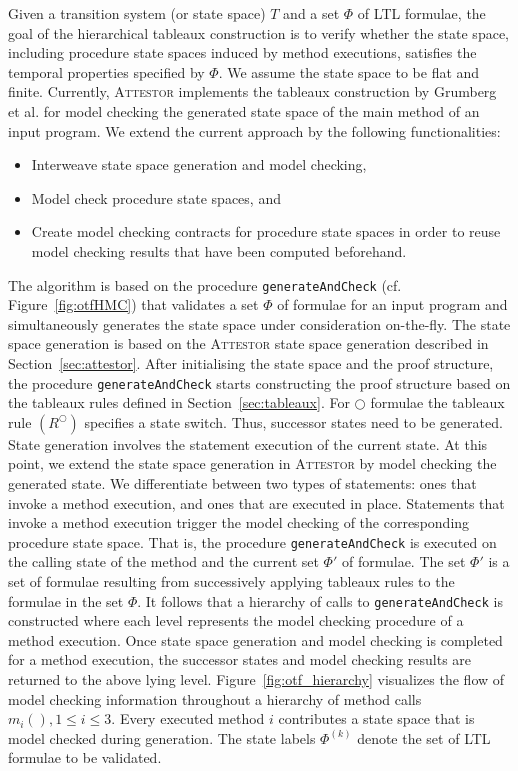 \documentclass[a4paper, 12pt, twoside]{report}
\begin{document}
	Given a transition system (or state space) $T$ and a set $\Phi$ of LTL formulae, the goal of the hierarchical tableaux construction is to verify whether the state space, including procedure state spaces induced by method executions, satisfies the temporal properties specified by $\Phi$. We assume the state space to be flat and finite. Currently, \textsc{Attestor} implements the tableaux construction by Grumberg et al. for model checking the generated state space of the main method of an input program. We extend the current approach by the following functionalities:
	\begin{itemize}
		\item Interweave state space generation and model checking,
		\item Model check procedure state spaces, and
		\item Create model checking contracts for procedure state spaces in order to reuse model checking results that have been computed beforehand.
	\end{itemize}	

	The algorithm is based on the procedure \texttt{generateAndCheck} (cf. Figure~\ref{fig:otfHMC}) that validates a set $\Phi$ of formulae for an input program and simultaneously generates the state space under consideration on-the-fly. The state space generation is based on the \textsc{Attestor} state space generation described in Section~\ref{sec:attestor}. After initialising the state space and the proof structure, the procedure \texttt{generateAndCheck} starts constructing the proof structure based on the tableaux rules defined in Section~\ref{sec:tableaux}. For $\bigcirc$ formulae the tableaux rule $(R^{\bigcirc})$ specifies a state switch. Thus, successor states need to be generated. State generation involves the statement execution of the current state. At this point, we extend the state space generation in \textsc{Attestor} by model checking the generated state. We differentiate between two types of statements: ones that invoke a method execution, and ones that are executed in place. Statements that invoke a method execution trigger the model checking of the corresponding procedure state space. That is, the procedure \texttt{generateAndCheck} is executed on the calling state of the method and the current set $\Phi'$ of formulae. The set $\Phi'$ is a set of formulae resulting from successively applying tableaux rules to the formulae in the set $\Phi$. It follows that a hierarchy of calls to \texttt{generateAndCheck} is constructed where each level represents the model checking procedure of a method execution. Once state space generation and model checking is completed for a method execution, the successor states and model checking results are returned to the above lying level. Figure~\ref{fig:otf_hierarchy} visualizes the flow of model checking information throughout a hierarchy of method calls $m_i(), 1 \leq i \leq 3$. Every executed method $i$ contributes a state space that is model checked during generation. The state labels $\Phi^{(k)}$ denote the set of LTL formulae to be validated.
	
\end{document}
